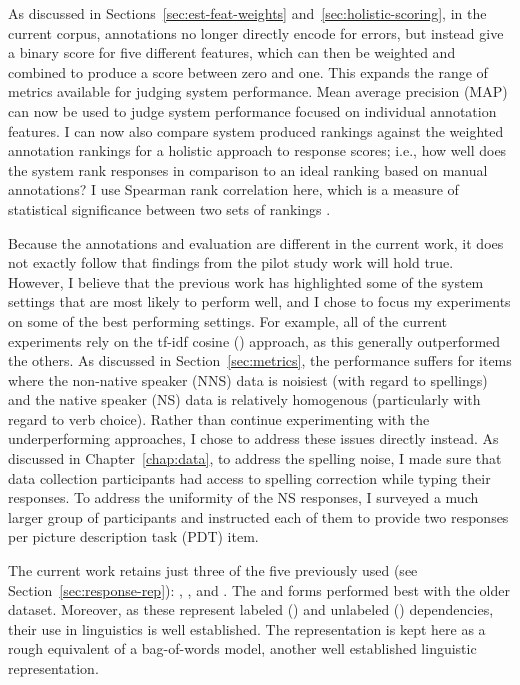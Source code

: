 As discussed in Sections~\ref{sec:est-feat-weights} and~\ref{sec:holistic-scoring}, in the current corpus, annotations no longer directly encode for errors, but instead give a binary score for five different features, which can then be weighted and combined to produce a score between zero and one. This expands the range of metrics available for judging system performance. Mean average precision (MAP) can now be used to judge system performance focused on individual annotation features. I can now also compare system produced rankings against the weighted annotation rankings for a holistic approach to response scores; i.e., how well does the system rank responses in comparison to an ideal ranking based on manual annotations? I use Spearman rank correlation here, which is a measure of statistical significance between two sets of rankings \cite{dodge2008concise}.

Because the annotations and evaluation are different in the current work, it does not exactly follow that findings from the pilot study work will hold true. However, I believe that the previous work has highlighted some of the system settings that are most likely to perform well, and I chose to focus my experiments on some of the best performing settings. For example, all of the current experiments rely on the tf-idf cosine () approach, as this generally outperformed the others. As discussed in Section~\ref{sec:metrics}, the  performance suffers for items where the non-native speaker (NNS) data is noisiest (with regard to spellings) and the native speaker (NS) data is relatively homogenous (particularly with regard to verb choice). Rather than continue experimenting with the underperforming approaches, I chose to address these issues directly instead. As discussed in Chapter~\ref{chap:data}, to address the spelling noise, I made sure that data collection participants had access to spelling correction while typing their responses. To address the uniformity of the NS responses, I surveyed a much larger group of participants and instructed each of them to provide two responses per picture description task (PDT) item.

The current work retains just three of the five  previously used (see Section~\ref{sec:response-rep}): , , and . The  and  forms performed best with the older dataset. Moreover, as these represent labeled () and unlabeled () dependencies, their use in linguistics is well established. The  representation is kept here as a rough equivalent of a bag-of-words model, another well established linguistic representation.

